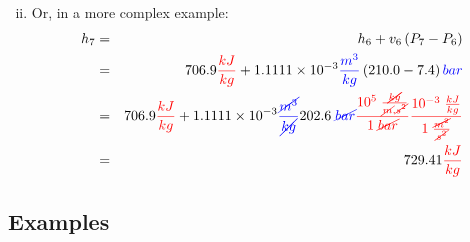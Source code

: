 \documentclass[12pts,a4paper,amsmath,amssymb,floatfix]{article}%
\begin{document}
\begin{enumerate}[(i)]
\begin{displaymath}
      \end{displaymath}
%
   \item Or, in a more complex example:
      \begin{eqnarray}
        h_{7} &=& h_{6} + v_{6}\left(P_{7}-P_{6}\right) \nonumber \\
              &=& 706.9\textcolor{red}{\frac{kJ}{kg}} + 1.1111\times 10^{-3}\textcolor{blue}{\frac{m^{3}}{kg}}\left(210.0-7.4\right)\textcolor{blue}{bar} \nonumber \\
              &=& 706.9\textcolor{red}{\frac{kJ}{kg}} + 1.1111\times 10^{-3}\textcolor{blue}{\frac{\cancel{m^{3}}}{\cancel{kg}}} 202.6\;\textcolor{blue}{\cancel{bar}} \textcolor{red}{\frac{10^{5}\;\frac{\cancel{kg}}{\cancel{m}.\cancel{s^{2}}}}{1\; \cancel{bar}}} \textcolor{red}{\frac{10^{-3}\; \frac{kJ}{kg}}{1\;\frac{\cancel{m^{2}}}{\cancel{s^{2}}}}} \nonumber \\
              &=& 729.41\textcolor{red}{\frac{kJ}{kg}} \nonumber 
      \end{eqnarray} 
%
\end{enumerate}


\clearpage

\subsection{Examples}
\end{document}
